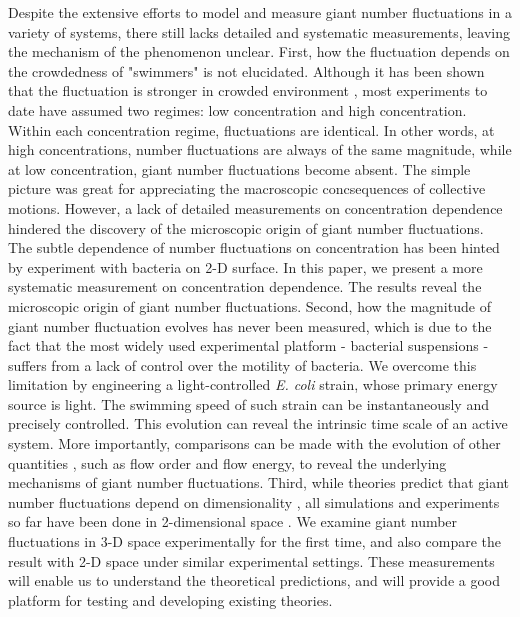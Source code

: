 \documentclass[twocolumn,aps,prl,amsmath,amssymb,longbibliography]{revtex4-2}
\begin{document}
Despite the extensive efforts to model and measure giant number fluctuations in a variety of systems, there still lacks detailed and systematic measurements, leaving the mechanism of the phenomenon unclear. First, how the fluctuation depends on the crowdedness of "swimmers" is not elucidated. Although it has been shown that the fluctuation is stronger in crowded environment \cite{PhysRevE.95.020601, Zhang13626}, most experiments to date have assumed two regimes: low concentration and high concentration. Within each concentration regime, fluctuations are identical. In other words, at high concentrations, number fluctuations are always of the same magnitude, while at low concentration, giant number fluctuations become absent. The simple picture was great for appreciating the macroscopic concsequences of collective motions. However, a lack of detailed measurements on concentration dependence hindered the discovery of the microscopic origin of giant number fluctuations. The subtle dependence of number fluctuations on concentration has been hinted by experiment with bacteria on 2-D surface\cite{Zhang13626}. In this paper, we present a more systematic measurement on concentration dependence. The results reveal the microscopic origin of giant number fluctuations. Second, how the magnitude of giant number fluctuation evolves has never been measured, which is due to the fact that the most widely used experimental platform - bacterial suspensions - suffers from a lack of control over the motility of bacteria. We overcome this limitation by engineering a light-controlled \textit{E. coli} strain, whose primary energy source is light. The swimming speed of such strain can be instantaneously and precisely controlled. This evolution can reveal the intrinsic time scale of an active system. More importantly, comparisons can be made with the evolution of other quantities \cite{Peng2020}, such as flow order and flow energy, to reveal the underlying mechanisms of giant number fluctuations. Third, while theories predict that giant number fluctuations depend on dimensionality \cite{PhysRevLett.75.4326, PhysRevE.58.4828, EPL2003, doi:10.1146/annurev-conmatphys-031119-050752}, all simulations and experiments so far have been done in 2-dimensional space
\cite{PhysRevE.77.046113, PhysRevLett.123.218001, Schaller4488, PhysRevE.95.020601}. We examine giant number fluctuations in 3-D space experimentally for the first time, and also compare the result with 2-D space under similar experimental settings. These measurements will enable us to understand the theoretical predictions, and will provide a good platform for testing and developing existing theories.
\end{document}
